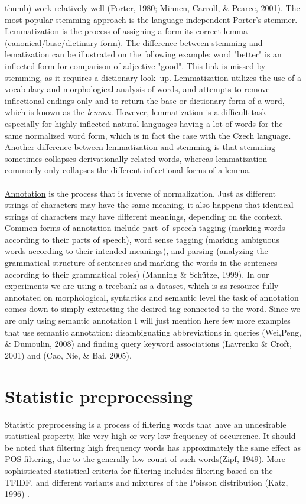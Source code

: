 thumb) work relatively well (Porter, 1980; Minnen, Carroll, \& Pearce, 2001)\cite{porter_1980}. The most 
popular stemming approach is the language independent Porter's stemmer.  \underline{Lemmatization} is 
the process of assigning a form its correct lemma (canonical/base/dictinary form). The difference between stemming and lematization can be illustrated on the following 
example: word "better" is an inflected form for comparison of adjective  "good".  
This link is missed by stemming, as it requires a 
dictionary look--up. Lemmatization utilizes the use of a vocabulary and morphological analysis of words, 
and attempts to remove inflectional endings only and to return the base or dictionary form of a word, 
which is known as the \textit{lemma}. However, lemmatization is a difficult task-- especially for highly 
inflected natural languages having a lot of words for the same normalized word form, which is in fact the 
case with the Czech language. Another difference between lemmatization and stemming is that stemming 
sometimes collapses derivationally related words, whereas lemmatization commonly only collapses 
the different inflectional forms of a lemma.
\\\\  \underline{Annotation} is the process that is inverse of normalization. Just as different strings of 
characters may have the same meaning, it also happens that identical strings of characters may have 
different meanings, depending on the context. Common forms of annotation include part--of--speech 
tagging (marking words according to their parts of speech), word sense tagging (marking ambiguous 
words according to their intended meanings), and parsing (analyzing the grammatical structure of 
sentences and marking the words in the sentences according to their grammatical roles) (Manning \& 
Sch\"utze, 1999)\cite{manning1999foundations}.  In our experiments we are using a treebank  as a 
dataset, which is as resource fully annotated on morphological, syntactics and semantic level the task of 
annotation comes down to simply extracting the desired tag connected to the word. Since we are only 
using semantic annotation I will just mention here few more examples that use semantic annotation: 
disambiguating abbreviations in queries (Wei,Peng, \& Dumoulin, 2008)\cite{wei_peng2008} and finding 
query keyword associations (Lavrenko \& Croft, 2001)\cite{Lavrenko+Croft:01a} and  (Cao, Nie, \& Bai, 
2005)\cite{bainJingSong2005}.

\section{Statistic preprocessing}
Statistic preprocessing is a process of filtering words that have an undesirable statistical property, like very high or very low frequency of occurrence. It should be noted that filtering high frequency words has approximately the same effect as POS filtering, due to the generally low count of such words(Zipf, 1949)\cite{zipf1949_1}. More sophisticated statistical criteria for filtering includes filtering based on the TFIDF, and different variants and mixtures of the Poisson distribution (Katz, 1996) \cite{katz_1996}.

